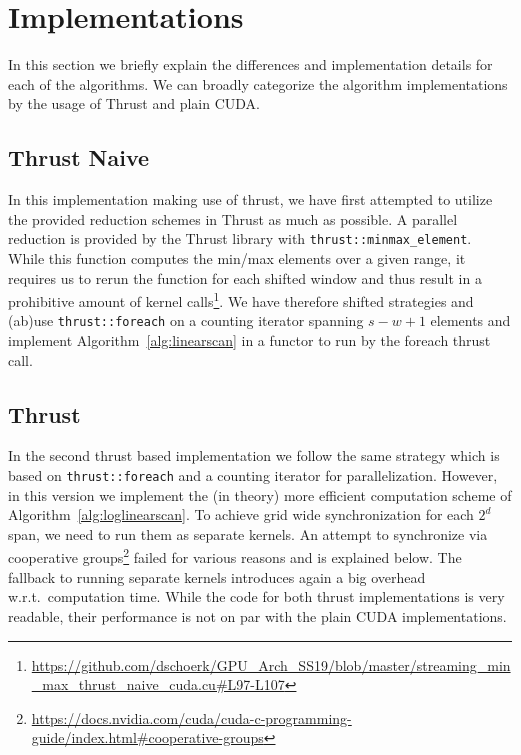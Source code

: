 \section{Implementations}
In this section we briefly explain the differences and implementation details for each of the algorithms. We can broadly categorize the algorithm implementations by the usage of Thrust and plain CUDA. 

\subsection{Thrust Naive}
\label{sec:thrust_naive}
In this implementation making use of thrust, we have first attempted to utilize the provided reduction schemes in Thrust as much as possible. A parallel reduction is provided by the Thrust library with \texttt{thrust::minmax\_element}. While this function computes the min/max elements over a given range, it requires us to rerun the function for each shifted window and thus result in a prohibitive amount of kernel calls\footnote{\url{https://github.com/dschoerk/GPU_Arch_SS19/blob/master/streaming\_min\_max\_thrust\_naive\_cuda.cu\#L97-L107}}.  We have therefore shifted strategies and (ab)use \texttt{thrust::foreach} on a counting iterator spanning $s - w + 1$ elements and implement Algorithm~\ref{alg:linearscan} in a functor to run by the foreach thrust call. 

\subsection{Thrust}
In the second thrust based implementation we follow the same strategy which is based on \texttt{thrust::foreach} and a counting iterator for parallelization. However, in this version we implement the (in theory) more efficient computation scheme of Algorithm~\ref{alg:loglinearscan}. To achieve grid wide synchronization for each $2^d$ span, we need to run them as separate kernels. An attempt to synchronize via cooperative groups\footnote{\url{https://docs.nvidia.com/cuda/cuda-c-programming-guide/index.html\#cooperative-groups}} failed for various reasons and is explained below. The fallback to running separate kernels introduces again a big overhead w.r.t.\ computation time. While the code for both thrust implementations is very readable, their performance is not on par with the plain CUDA implementations.


